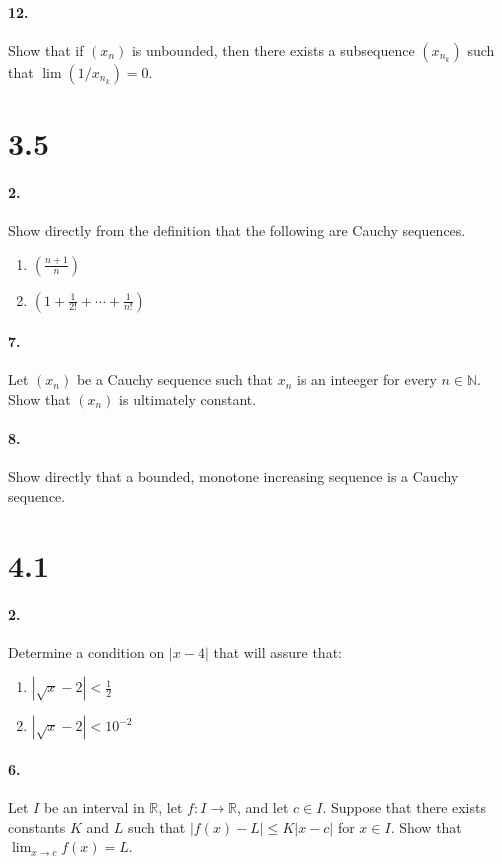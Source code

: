 \documentclass[12pt]{article}
\newcommand\R{\mathbb{R}}
\newcommand\N{\mathbb{N}}
\theoremstyle{remark}
\begin{document}
\paragraph{12.}
Show that if $(x_n)$ is unbounded, then there exists a subsequence $(x_{n_k})$ such that $\lim(1/x_{n_k}) = 0$.

\section*{3.5}
\paragraph{2.}
Show directly from the definition that the following are Cauchy sequences.
\begin{enumerate}[label=(\alph*)]
    \item $(\frac{n + 1}{n})$
    \item $(1 + \frac{1}{2!} + \cdots + \frac{1}{n!})$
\end{enumerate}

\paragraph{7.}
Let $(x_n)$ be a Cauchy sequence such that $x_n$ is an inteeger for every $n \in \N$. Show that $(x_n)$ is ultimately constant.

\paragraph{8.}
Show directly that a bounded, monotone increasing sequence is a Cauchy sequence.

\section*{4.1}
\paragraph{2.} Determine a condition on $|x - 4|$ that will assure that:
\begin{enumerate}[label=(\alph*)]
    \item $|\sqrt{x} - 2| < \frac{1}{2}$
    \item $|\sqrt{x} - 2| < 10^{-2}$
\end{enumerate}

\paragraph{6.} Let $I$ be an interval in $\R$, let $f: I \to \R$, and let $c \in I$. Suppose that there exists constants $K$ and $L$ such that $|f(x) - L| \leq K|x - c|$ for $x \in I$. Show that $\lim_{x \to c} f(x) = L$.
\end{document}
